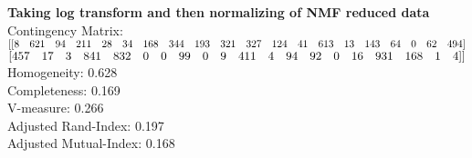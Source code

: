 \documentclass{article}
\begin{document}
\textbf{Taking log transform and then normalizing of NMF reduced data}\\
Contingency Matrix:\\
$[[  8 \quad621\quad  94 \quad211\quad  28\quad  34\quad 168\quad 344\quad 193\quad 321\quad 327\quad 124\quad  41\quad 613 \quad 13 \quad143 \quad 64 \quad  0 \quad62 \quad494]\\$
$[457 \quad 17 \quad  3 \quad841 \quad832 \quad  0 \quad  0 \quad 99 \quad  0 \quad  9\quad 411  \quad 4  \quad94 \quad 92\quad   0 \quad 16 \quad931\quad168\quad 1 \quad  4]]\\$
Homogeneity: 0.628\\
Completeness: 0.169\\
V-measure: 0.266\\
Adjusted Rand-Index: 0.197\\
Adjusted Mutual-Index: 0.168\\
\begin{figure}[h]
	\centering
	\qquad
\end{figure}
\end{document}
